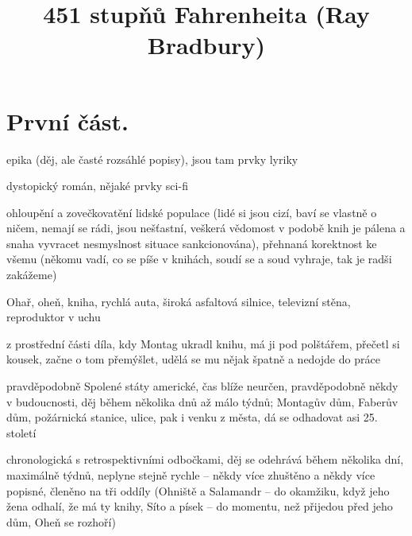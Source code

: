 \documentclass{article}
\title{\vspace{-2cm}451 stupňů Fahrenheita (Ray Bradbury)\vspace{-2cm}}
\date{}
\author{}
\begin{document}
\maketitle
\section{První část.}
\begin{description}
    \setlength\itemsep{0.15em}
    \item[druh:] epika (děj, ale časté rozsáhlé popisy), jsou tam prvky lyriky
    \item[žánr:] dystopický román, nějaké prvky sci-fi
    \item[téma:] ohloupění a zovečkovatění lidské populace (lidé si jsou cizí, baví se vlastně o ničem, nemají se rádi, jsou nešťastní, veškerá vědomost v podobě knih je pálena a snaha vyvracet nesmyslnost situace sankcionována), přehnaná korektnost ke všemu (někomu vadí, co se píše v knihách, soudí se a soud vyhraje, tak je radši zakážeme)
    \item[motivy:] Ohař, oheň, kniha, rychlá auta, široká asfaltová silnice, televizní stěna, reproduktor v uchu
    \item[zařazení výňatku do kontextu díla:] z prostřední části díla, kdy Montag ukradl knihu, má ji pod polštářem, přečetl si kousek, začne o tom přemýšlet, udělá se mu nějak špatně a nedojde do práce
    \item[časoprostor:] pravděpodobně Spolené státy americké, čas blíže neurčen, pravděpodobně někdy v budoucnosti, děj během několika dnů až málo týdnů; Montagův dům, Faberův dům, požárnická stanice, ulice, pak i venku z města, dá se odhadovat asi 25. století
    \item[kompoziční výstavba:] chronologická s retrospektivními odbočkami, děj se odehrává během několika dní, maximálně týdnů, neplyne stejně rychle -- někdy více zhuštěno a někdy více popisné, členěno na tři oddíly (Ohniště a Salamandr -- do okamžiku, když jeho žena odhalí, že má ty knihy, Síto a písek -- do momentu, než přijedou před jeho dům, Oheň se rozhoří)
\end{description}
\end{document}
